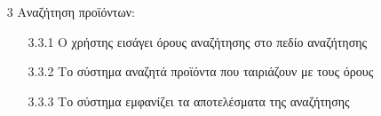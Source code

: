 \documentclass[12pt,a4paper,twoside]{book}
\begin{document}
\begin{enumerate}
  \item[3 ] Αναζήτηση προϊόντων:
        \begin{enumerate}
          \item[3.3.1 ] Ο χρήστης εισάγει όρους αναζήτησης στο πεδίο αναζήτησης %
          \item[3.3.2 ] Το σύστημα αναζητά προϊόντα που ταιριάζουν με τους όρους
          \item[3.3.3 ] Το σύστημα εμφανίζει τα αποτελέσματα της αναζήτησης
        \end{enumerate}

\end{enumerate}
\end{document}
